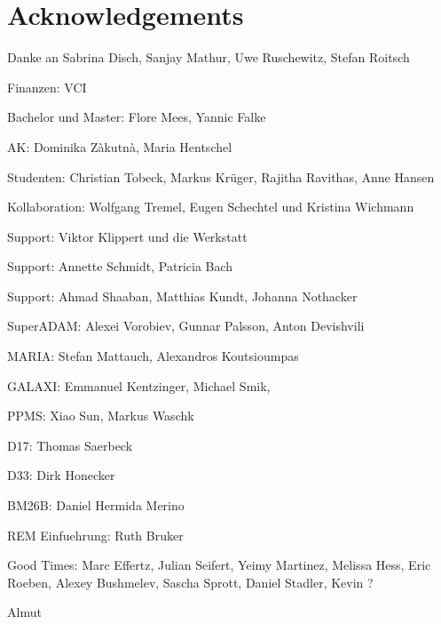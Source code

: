 \documentclass[\main/dresen_thesis.tex]{subfiles}
\begin{document}
	\section*{Acknowledgements}
	Danke an Sabrina Disch, Sanjay Mathur, Uwe Ruschewitz, Stefan Roitsch

	Finanzen: VCI

	Bachelor und Master: Flore Mees, Yannic Falke

	AK: Dominika Zàkutnà, Maria Hentschel

	Studenten: Christian Tobeck, Markus Kr\"uger, Rajitha Ravithas, Anne Hansen

	Kollaboration: Wolfgang Tremel, Eugen Schechtel und Kristina Wichmann

	Support: Viktor Klippert und die Werkstatt

	Support: Annette Schmidt, Patricia Bach

	Support: Ahmad Shaaban, Matthias Kundt, Johanna Nothacker

	SuperADAM: Alexei Vorobiev, Gunnar Palsson, Anton Devishvili

	MARIA: Stefan Mattauch, Alexandros Koutsioumpas

	GALAXI: Emmanuel Kentzinger, Michael Smik,

	PPMS: Xiao Sun, Markus Waschk

	D17: Thomas Saerbeck

	D33: Dirk Honecker

	BM26B: Daniel Hermida Merino

	REM Einfuehrung: Ruth Bruker

	Good Times: Marc Effertz, Julian Seifert, Yeimy Martinez, Melissa Hess, Eric Roeben, Alexey Bushmelev, Sascha Sprott, Daniel Stadler, Kevin ?

	Almut
\end{document}
